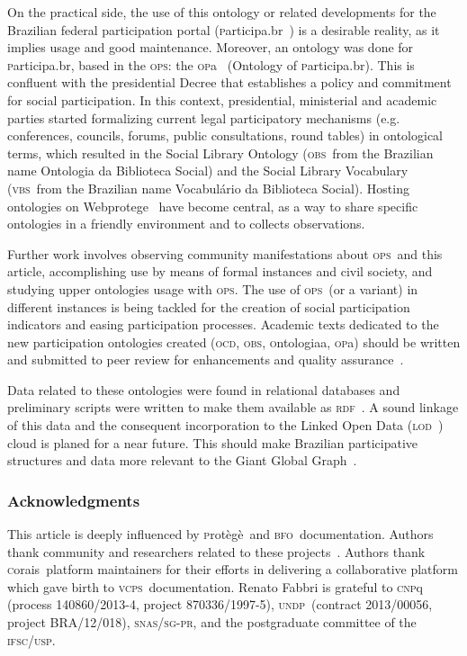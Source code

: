 \documentclass[10pt,letterpaper]{article}
\newcommand{\ops}{\textsc{ops}}
\newcommand{\vcps}{\textsc{vcps}}
\newcommand{\bfo}{\textsc{bfo}}
\newcommand{\opa}{\textsc{op}a}
\newcommand{\ocd}{\textsc{ocd}}
\newcommand{\ontologiaa}{\textsc{o}ntologiaa}
\newcommand{\obs}{\textsc{obs}}
\newcommand{\rdf}{\textsc{rdf}}
\newcommand{\participa}{\textsc{p}articipa.br}
\newcommand{\pnud}{\textsc{undp}}
\newcommand{\vbs}{\textsc{vbs}}
\newcommand{\lod}{\textsc{lod}}
\newcommand{\corais}{\textsc{c}orais}
\newcommand{\protege}{\textsc{p}rot\`eg\`e}
\begin{document}
On the practical side, the use of this ontology or related developments for the Brazilian federal participation portal (\participa~\cite{participa}) is a desirable reality, as it implies usage and good maintenance.  Moreover, an ontology was done for \participa, based in the \ops: the \opa~\cite{pnud5} (Ontology of \participa). This is confluent with the presidential Decree that establishes a policy and commitment for social participation\cite{decree}. In this context, presidential, ministerial and academic parties started formalizing current legal participatory mechanisms (e.g. conferences, councils, forums, public consultations, round tables) in ontological terms, which resulted in the Social Library Ontology (\obs\ from the Brazilian name Ontologia da Biblioteca Social) and the Social Library Vocabulary (\vbs\ from the Brazilian name Vocabul\'ario da Biblioteca Social).
Hosting ontologies on Webprotege~\cite{webprotege} have become central, as a way to share specific ontologies in a friendly environment and to collects observations.

Further work involves observing community manifestations about \ops\ and this article, accomplishing use by means of formal instances and civil society, and studying upper ontologies usage with \ops. The use of \ops\ (or a variant) in different instances is being tackled for the creation of social participation indicators and easing participation processes.
Academic texts dedicated to the new participation ontologies created (\ocd, \obs, \ontologiaa, \opa) should be written and submitted to peer review for enhancements and quality assurance~\cite{pnud5}.

Data related to these ontologies were found in relational databases and preliminary scripts were written to make them available as \rdf~\cite{datahub}. A sound linkage of this data and the consequent incorporation to the Linked Open Data (\lod~\cite{lod}) cloud is planed for a near future. This should make Brazilian participative structures and data more relevant to the Giant Global Graph~\cite{ggg}.

\subsubsection*{Acknowledgments}
This article is deeply influenced by \protege\ and \bfo\ documentation. Authors thank community and researchers related to these projects~\cite{protege,bfo}.
Authors thank \corais\ platform maintainers for their efforts in delivering a collaborative platform which gave birth to \vcps\ documentation.
Renato Fabbri is grateful to \textsc{cnp}q (process 140860/2013-4, project 870336/1997-5), \pnud\ (contract 2013/00056, project BRA/12/018), \textsc{snas/sg-pr}, and the postgraduate committee of the \textsc{ifsc/usp}.
\end{document}
